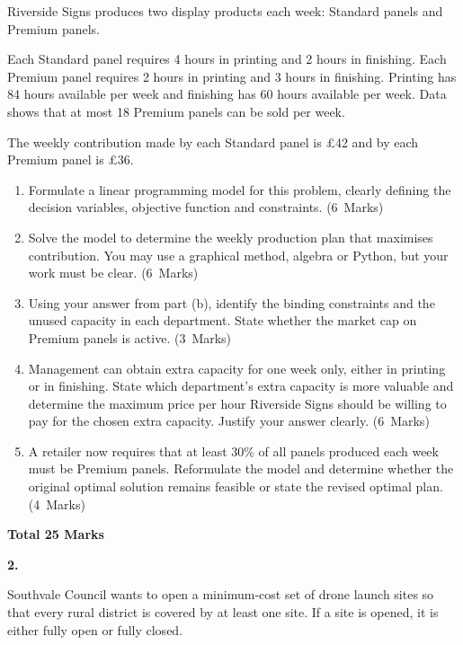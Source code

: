 \documentclass[11pt,a4paper]{article}
\newcommand{\markalloc}[1]{\nobreak\hfill\mbox{(#1 Marks)}}
\newcommand{\questiontotal}[1]{\begin{flushright}\textbf{Total #1 Marks}\end{flushright}}
\begin{document}
Riverside Signs produces two display products each week: Standard panels and Premium panels.

Each Standard panel requires 4 hours in printing and 2 hours in finishing.
Each Premium panel requires 2 hours in printing and 3 hours in finishing.
Printing has 84 hours available per week and finishing has 60 hours available per week.
Data shows that at most 18 Premium panels can be sold per week.

The weekly contribution made by each Standard panel is \pounds42 and by each Premium panel is \pounds36.

\begin{enumerate}
\item Formulate a linear programming model for this problem, clearly defining the decision variables, objective function and constraints. \markalloc{6}

\item Solve the model to determine the weekly production plan that maximises contribution. You may use a graphical method, algebra or Python, but your work must be clear. \markalloc{6}

\item Using your answer from part (b), identify the binding constraints and the unused capacity in each department. State whether the market cap on Premium panels is active. \markalloc{3}

\item Management can obtain extra capacity for one week only, either in printing or in finishing.
State which department's extra capacity is more valuable and determine the maximum price per hour Riverside Signs should be willing to pay for the chosen extra capacity. Justify your answer clearly. \markalloc{6}

\item A retailer now requires that at least 30\% of all panels produced each week must be Premium panels.
Reformulate the model and determine whether the original optimal solution remains feasible or state the revised optimal plan. \markalloc{4}
\end{enumerate}

\questiontotal{25}

\newpage

\textbf{2.}

Southvale Council wants to open a minimum-cost set of drone launch sites so that every rural district is covered by at least one site.
If a site is opened, it is either fully open or fully closed.
\end{document}
